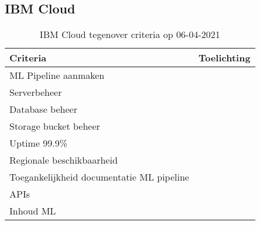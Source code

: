 \subsection*{IBM Cloud}\label{appendix:detailed-overview-of-cloud-computing-platforms:ibm-cloud}
\begin{table}[hbt!]
  \centering
  \begin{tabular}{|p{.2\linewidth}|p{.74\linewidth}|}
  \hline
  \textbf{Criteria} & \textbf{Toelichting} \\ \hline
    ML Pipeline \newline aanmaken
    &

    \\ \hline

    Serverbeheer
    &

    \\ \hline

    Database beheer
    &

    \\ \hline

    Storage \newline bucket beheer
    &

    \\ \hline

    Uptime 99.9\%
    &

    \\ \hline

    Regionale \newline beschikbaarheid
    &

    \\ \hline

    Toegankelijkheid documentatie ML pipeline
    &

    \\ \hline

    APIs
    &

    \\ \hline

    Inhoud ML
    &

    \\ \hline
  \end{tabular}
  \caption{IBM Cloud tegenover criteria op 06-04-2021}
  \label{table:ibm-cloud-against-criteria}
\end{table}

\newpage

